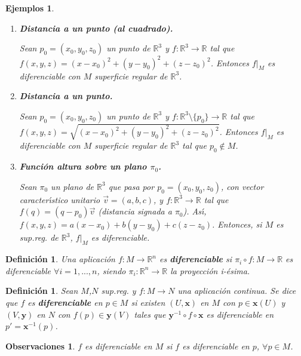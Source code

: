 \documentclass[ebook,oneside]{memoir}
\newtheorem{defn}[thm]{Definición}
\newtheorem{rem}[thm]{Observaciones}
\newtheorem{eje}[thm]{Ejemplos}
\begin{document}
\begin{eje}

\

\begin{enumerate}
\item \textbf{Distancia a un punto (al cuadrado).}


Sean $p_0=(x_0,y_0,z_0)$ un punto de $\mathbb{R}^3$ y $f: \mathbb{R}^3 \rightarrow \mathbb{R}$ tal que $f(x,y,z)=(x-x_0)^2+(y-y_0)^2+(z-z_0)
^2$. Entonces $f\vert_M$ es diferenciable con $M$ superficie regular de $\mathbb{R}^3$.

\item \textbf{Distancia a un punto. }

Sean $p_0=(x_0,y_0,z_0)$ un punto de $\mathbb{R}^3$
y $f: \mathbb{R}^3 \setminus\lbrace p_0\rbrace \rightarrow \mathbb{R}$ tal que $f(x,y,z)=\sqrt{(x-x_0)^2+(y-y_0)^2+(z-z_0)
^2}$. Entonces  $f\vert_M$ es diferenciable con $M$ superficie regular de $\mathbb{R}^3$ tal que $p_0 \notin M$.

\item \textbf{Funci\'on altura sobre un plano  $\pi_0$.}

Sean $\pi_0$ un plano de $\mathbb{R}^3$ que pasa por $p_0=(x_0,y_0,z_0)$, con vector caracter\'{\i}stico unitario $\overrightarrow{v}=(a,b,c)$, y $f: \mathbb{R}^3 \rightarrow \mathbb{R}$ tal que $f(q)=(q-p_0)\overrightarrow{v}$ (distancia signada a $\pi_0$). As\'{\i}, $f(x,y,z)=a(x-x_0)+b(y-y_0)+c(z-z_0)$. Entonces, si $M$ es sup.reg. de $\mathbb{R}^3$, $f\vert_M$ es diferenciable.
\end{enumerate}
\end{eje}

\begin{defn}
Una aplicaci\'on $f: M \rightarrow \mathbb{R}^n$ es \textbf{diferenciable} si $\pi_i \circ f: M \rightarrow \mathbb{R}$ es diferenciable $\forall i =1,...,n$, siendo $\pi_i : \mathbb{R}^n \rightarrow \mathbb{R}$ la proyecci\'on i-\'esima.
\end{defn}

\begin{defn}
Sean $M$,$N$ sup.reg. y $f: M\rightarrow N$ una aplicaci\'on continua. Se dice que $f$ es \textbf{diferenciable} en $p\in M$  si existen $(U,\textbf{x})$ en $M$ con $p \in \textbf{x}(U)$ y $(V,\textbf{y})$ en $N$ con $f(p) \in \textbf{y}(V)$ tales que $\textbf{y}^{-1}\circ f \circ \textbf{x}$ es diferenciable en $p' = \textbf{x}^{-1}(p)$.
\end{defn}

\begin{rem}
$f$ es diferenciable en $M$ si $f$ es diferenciable en $p$, $\forall p \in M$.
\end{rem}
\end{document}

